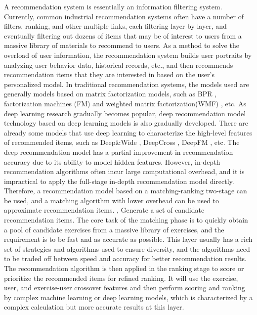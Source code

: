 A recommendation system is essentially an information filtering system. Currently, common industrial recommendation systems often have a number of filters, ranking, and other multiple links, each filtering layer by layer, and eventually filtering out dozens of items that may be of interest to users from a massive library of materials to recommend to users. As a method to solve the overload of user information, the recommendation system builds user portraits by analyzing user behavior data, historical records, etc., and then recommends recommendation items that they are interested in based on the user's personalized model. In traditional recommendation systems, the models used are generally models based on matrix factorization models, such as BPR \cite{rendle2012bpr}, factorization machines (FM) \cite{koren2008factorization} and weighted matrix factorization(WMF) \cite{hu2008collaborative}, etc. As deep learning research gradually becomes popular, deep recommendation model technology based on deep learning models is also gradually developed. There are already some models that use deep learning to characterize the high-level features of recommended items, such as Deep\&Wide \cite{cheng2016wide}, DeepCross \cite{shan2016deep}, DeepFM \cite{guo2017deepfm}, etc. The deep recommendation model has a partial improvement in recommendation accuracy due to its ability to model hidden features. However, in-depth recommendation algorithms often incur large computational overhead, and it is impractical to apply the full-stage in-depth recommendation model directly. Therefore, a recommendation model based on a matching-ranking two-stage can be used, and a matching algorithm with lower overhead can be used to approximate recommendation items. , Generate a set of candidate recommendation items. The core task of the matching phase is to quickly obtain a pool of candidate exercises from a massive library of exercises, and the requirement is to be fast and as accurate as possible. This layer usually has a rich set of strategies and algorithms used to ensure diversity, and the algorithms need to be traded off between speed and accuracy for better recommendation results. The recommendation algorithm is then applied in the ranking stage to score or prioritize the recommended items for refined ranking. It will use the exercise, user, and exercise-user crossover features and then perform scoring and ranking by complex machine learning or deep learning models, which is characterized by a complex calculation but more accurate results at this layer.

